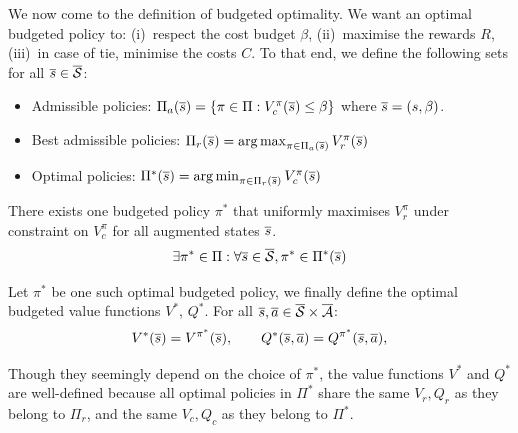 \documentclass{article}
\begin{document}
\begin{definition}
We now come to the definition of budgeted optimality. We want an optimal budgeted policy to: (i)~respect the cost budget $\beta$, (ii)~maximise the rewards $R$, (iii)~in case of tie, minimise the costs $C$. To that end, we define the following sets for all $\overline{s}\in\overline{\mathcal{S}}$:
\begin{itemize}
    \item Admissible policies: $\Pi_a(\overline{s}) = \{\pi\in\Pi: V_c^\pi(\overline{s}) \leq \beta\}$ where $\overline{s} = (s, \beta)$.
    \item Best admissible policies: $\Pi_r(\overline{s}) = \operatorname*{arg\,max}_{\pi\in\Pi_a(\overline{s})}  V_r^\pi(\overline{s})$
    \item Optimal policies: $\Pi^*(\overline{s}) = \operatorname*{arg\,min}_{\pi\in\Pi_r(\overline{s})}  V_c^\pi(\overline{s})$
\end{itemize}
\end{definition}


\begin{assumption}
There exists one budgeted policy $\pi^*$ that uniformly maximises $V_r^\pi$ under constraint on $V_c^\pi$ for all augmented states $\overline{s}$.
\begin{align*}
    \exists \pi^*\in\Pi: \forall \overline{s}\in \overline{\mathcal{S}}, \pi^*\in\Pi^*(\overline{s})
\end{align*}
\end{assumption}

Let $\pi^*$ be one such optimal budgeted policy, we finally define the optimal budgeted value functions $V^*$, $Q^*$. For all $\overline{s}, \overline{a} \in \overline{\mathcal{S}}\times\overline{\mathcal{A}}$:
\begin{equation*}
    V^*(\overline{s}) = V^{\pi^*}(\overline{s}), \qquad Q^*(\overline{s}, \overline{a}) =  Q^{\pi^*}(\overline{s}, \overline{a}),
\end{equation*}

\begin{remark}
\label{rmk:independence}
Though they seemingly depend on the choice of $\pi^*$, the value functions $V^*$ and $Q^*$ are well-defined because all optimal policies in $\Pi^*$ share the same $V_r, Q_r$ as they belong to $\Pi_r$, and the same $V_c, Q_c$  as they belong to $\Pi^*$.
\end{remark}
\end{document}
